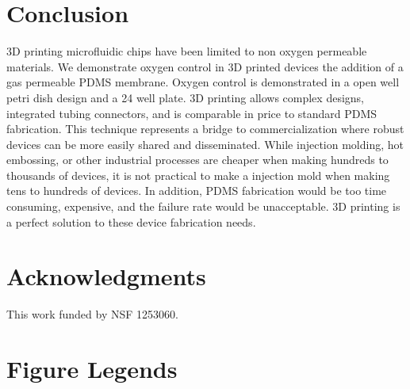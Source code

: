 
\section*{Conclusion}
3D printing microfluidic chips have been limited to non oxygen permeable materials.
We demonstrate oxygen control in 3D printed devices the addition of a gas permeable PDMS membrane. 
Oxygen control is demonstrated in a open well petri dish design and a 24 well plate.
3D printing allows complex designs, integrated tubing connectors, and is comparable in price to standard PDMS fabrication.
This technique represents a bridge to commercialization where robust devices can be more easily shared and disseminated.
While injection molding, hot embossing, or other industrial processes are cheaper when making hundreds to thousands of devices, it is not practical to make a injection mold when making tens to hundreds of devices.
In addition, PDMS fabrication would be too time consuming, expensive, and the failure rate would be unacceptable.
3D printing is a perfect solution to these device fabrication needs.



\section*{Acknowledgments}

This work funded by NSF 1253060.





%
%
% 

\section*{Figure Legends}
%

